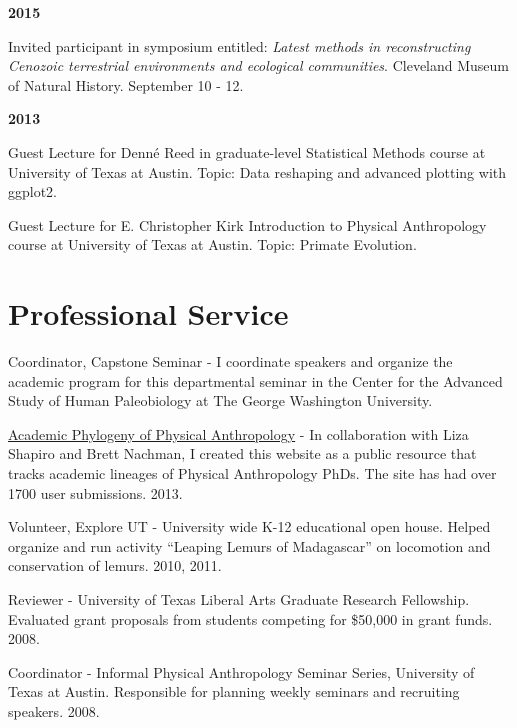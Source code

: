 \documentclass{article}
\begin{document}
\begin{description*}
\item[] {\bfseries 2015}
\item[] Invited participant in symposium entitled: \emph{Latest methods in reconstructing Cenozoic terrestrial environments and ecological communities}. Cleveland Museum of Natural History. September 10 - 12.
\item[] {\bfseries 2013}
\item[]  Guest Lecture for Denn\'{e} Reed in graduate-level Statistical Methods course at University of Texas at Austin. Topic: Data reshaping and advanced plotting with ggplot2.
\item[] Guest Lecture for E. Christopher Kirk Introduction to Physical Anthropology course at University of Texas at Austin. Topic: Primate Evolution.
\end{description*}


\section*{Professional Service}
\begin{description*}
\item[] Coordinator, Capstone Seminar - I coordinate speakers and organize the academic program for this departmental seminar in the Center for the Advanced Study of Human Paleobiology at The George Washington University.

\item[] \href{http://www.physanthphylogeny.org}{Academic Phylogeny of Physical Anthropology} - In collaboration with Liza Shapiro and Brett Nachman, I created this website as a public resource that tracks academic lineages of Physical Anthropology PhDs. The site has had over 1700 user submissions. 2013.

\item[] Volunteer, Explore UT - University wide K-12 educational open house. Helped organize and run activity ``Leaping Lemurs of Madagascar'' on locomotion and conservation of lemurs. 2010, 2011.

\item[] Reviewer - University of Texas Liberal Arts Graduate Research Fellowship. Evaluated grant proposals from students competing for \$50,000 in grant funds. 2008.

\item[] Coordinator - Informal Physical Anthropology Seminar Series, University of Texas at Austin. Responsible for planning weekly seminars and recruiting speakers. 2008.
\end{description*}
\end{document}
